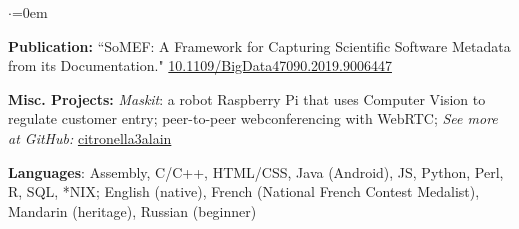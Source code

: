 \begin{list}{$\cdot$}{\leftmargin=0em} %
   \item \textbf{Publication:} ``SoMEF: A Framework for Capturing Scientific Software Metadata from its Documentation." \href{https://doi.org/10.1109/BigData47090.2019.9006447}{10.1109/BigData47090.2019.9006447}
   \item \textbf{Misc. Projects:} \textit{Maskit}: a robot Raspberry Pi that uses Computer Vision to regulate customer entry; peer-to-peer webconferencing with WebRTC; \textit{See more at GitHub:} \href{https://github.com/citronella3alain}{citronella3alain}
   \item \textbf{Languages}: Assembly, C/C++, HTML/CSS, Java (Android), JS, Python, Perl, R, SQL, *NIX; English (native), French (National French Contest Medalist), Mandarin (heritage), Russian (beginner)
\end{list}

